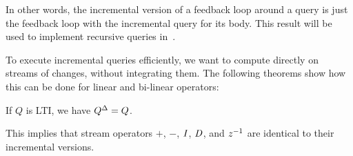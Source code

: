In other words, the incremental version of a feedback loop around a
query is just the feedback loop with the incremental query for its
body.  This result will be used to implement recursive queries
in~.

To execute incremental queries efficiently, we want to compute
directly on streams of changes, without integrating them.  The
following theorems show how this can be done for linear and bi-linear
operators:

\begin{theorem}[Linear]\label{linear}
If $Q$ is LTI, we have ${Q}^{\Delta}=Q$.
\end{theorem}

This implies that stream operators $+$, $-$, $\mathit{I}$, $\mathit{D}$, and $z^{-1}$ are
identical to their incremental versions.

